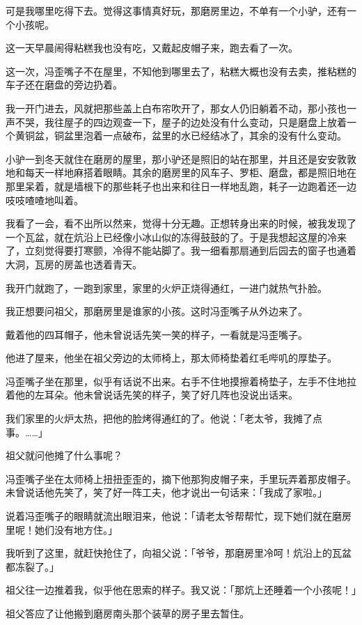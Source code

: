 \documentclass[UTF8]{ctexart}
\begin{document}
可是我哪里吃得下去。觉得这事情真好玩，那磨房里边，不单有一个小驴，还有一个小孩呢。

这一天早晨闹得粘糕我也没有吃，又戴起皮帽子来，跑去看了一次。

这一次，冯歪嘴子不在屋里，不知他到哪里去了，粘糕大概也没有去卖，推粘糕的车子还在磨盘的旁边扔着。

我一开门进去，风就把那些盖上白布帘吹开了，那女人仍旧躺着不动，那小孩也一声不哭，我往屋子的四边观查一下，屋子的边处没有什么变动，只是磨盘上放着一个黄铜盆，铜盆里泡着一点破布，盆里的水已经结冰了，其余的没有什么变动。

小驴一到冬天就住在磨房的屋里，那小驴还是照旧的站在那里，并且还是安安敦敦地和每天一样地麻搭着眼睛。其余的磨房里的风车子、罗柜、磨盘，都是照旧地在那里呆着，就是墙根下的那些耗子也出来和往日一样地乱跑，耗子一边跑着还一边吱吱喳喳地叫着。

我看了一会，看不出所以然来，觉得十分无趣。正想转身出来的时候，被我发现了一个瓦盆，就在炕沿上已经像小冰山似的冻得鼓鼓的了。于是我想起这屋的冷来了，立刻觉得要打寒颤，冷得不能站脚了。我一细看那扇通到后园去的窗子也通着大洞，瓦房的房盖也透着青天。

我开门就跑了，一跑到家里，家里的火炉正烧得通红，一进门就热气扑脸。

我正想要问祖父，那磨房里是谁家的小孩。这时冯歪嘴子从外边来了。

戴着他的四耳帽子，他未曾说话先笑一笑的样子，一看就是冯歪嘴子。

他进了屋来，他坐在祖父旁边的太师椅上，那太师椅垫着红毛哔叽的厚垫子。

冯歪嘴子坐在那里，似乎有话说不出来。右手不住地摸擦着椅垫子，左手不住地拉着他的左耳朵。他未曾说话先笑的样子，笑了好几阵也没说出话来。

我们家里的火炉太热，把他的脸烤得通红的了。他说：「老太爷，我摊了点事。……」

祖父就问他摊了什么事呢？

冯歪嘴子坐在太师椅上扭扭歪歪的，摘下他那狗皮帽子来，手里玩弄着那皮帽子。未曾说话他先笑了，笑了好一阵工夫，他才说出一句话来：「我成了家啦。」

说着冯歪嘴子的眼睛就流出眼泪来，他说：「请老太爷帮帮忙，现下她们就在磨房里呢！她们没有地方住。」

我听到了这里，就赶快抢住了，向祖父说：「爷爷，那磨房里冷呵！炕沿上的瓦盆都冻裂了。」

祖父往一边推着我，似乎他在思索的样子。我又说：「那炕上还睡着一个小孩呢！」

祖父答应了让他搬到磨房南头那个装草的房子里去暂住。
\end{document}
